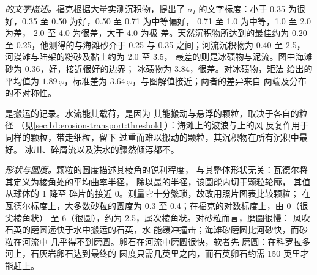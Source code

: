 \emph{的文字描述。}福克根据大量实测沉积物，提出了
$\sigma_I$ 的文字标度：小于 \num{0.35} 为很好，\num{0.35} 至
\num{0.50} 为好，\num{0.50} 至 \num{0.71} 为中等偏好，
\num{0.71} 至 \num{1.0} 为中等，\num{1.0} 至 \num{2.0} 为差，
\num{2.0} 至 \num{4.0} 为很差，大于 \num{4.0} 为极
差。天然沉积物所达到的最佳约为 \num{0.20} 至
\num{0.25}，他测得的与海滩砂介于
\num{0.25} 与 \num{0.35} 之间；河流沉积物为 \num{0.40} 至 \num{2.5}，
河漫滩与陆架的粉砂及黏土约为 \num{2.0} 至 \num{3.5}，
最差的则是冰碛物与泥流。图中海滩
砂为 \num{0.36}，好，接近很好的边界；
冰碛物为 \num{3.84}，很差。对冰碛物，矩法
给出的平均值为 $1.89\,\varphi$，标准差为
$3.64\,\varphi$，与图解值接近；两者的差异来自
两端及分布的不对称性。

是搬运的记录。水流能其载荷，是因为
其能搬动与悬浮的颗粒，取决于各自的粒径
（见\cref{sec:b1:erosion-transport:threshold}）：海滩上的波浪与上的风
反复作用于同样的颗粒，带走细粒，留下
过重而难以搬动的颗粒，其沉积物在所有沉积中最好。
冰川、碎屑流以及洪水的骤然倾泻都不。

\emph{形状与圆度。}颗粒的圆度描述其棱角的锐利程度，
与其整体形状无关：瓦德尔将其定义为棱角处的平均曲率半径，
除以最的半径，该圆能内切于颗粒轮廓，
其值从球体的 1 降至
碎片的接近 0。测量它十分繁琐，故改用照片图表比较颗粒；
在瓦德尔标度上，大多数砂粒的圆度为
\num{0.3} 至 \num{0.4}；在福克的对数标度上，由 0（很尖棱角状）
至 6（很圆），约为 \num{2.5}，属次棱角状。对砂粒而言，磨圆很慢：
风吹石英的磨圆远快于水中搬运的石英，水
能缓冲撞击；海滩砂磨圆比河砂快，而砂粒在河流中
几乎得不到磨圆。卵石在河流中磨圆很快，软者先
磨圆：在科罗拉多河上，石灰岩卵石达到最终的
圆度只需几英里之内，而石英卵石约需 150 英里才能赶上。

